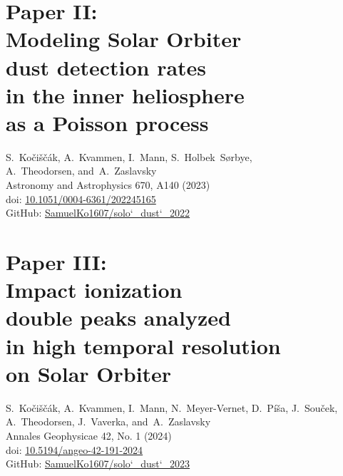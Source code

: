 \documentclass[11pt,twoside,openright]{book}
\begin{document}
\chapter[Paper II: Modeling Solar Orbiter dust detection rates in the inner heliosphere as a Poisson process]{Paper II:\\Modeling Solar Orbiter\\dust detection rates\\in the inner heliosphere\\as a Poisson process}
S.~Ko{\v{c}}i{\v{s}}{\v{c}}{\'a}k, A.~Kvammen, I.~Mann, S.~Holbek~S{\o}rbye,\\A.~Theodorsen, and~A.~Zaslavsky\\
Astronomy and Astrophysics 670, A140 (2023)\\
doi: \href{https://doi.org/10.1051/0004-6361/202245165}{10.1051/0004-6361/202245165}\\
GitHub: \href{https://zenodo.org/records/8325054}{SamuelKo1607/solo\char`_dust\char`_2022}\\
\newpage\null\newpage



\chapter[Paper III: Impact ionization double peaks analyzed in high temporal resolution on Solar Orbiter]{Paper III:\\Impact ionization\\double peaks analyzed\\in high temporal resolution\\on Solar Orbiter}
S.~Ko{\v{c}}i{\v{s}}{\v{c}}{\'a}k, A.~Kvammen, I.~Mann, N.~Meyer-Vernet, D.~P{\'i}{\v{s}}a, J.~Sou{\v{c}}ek, A.~Theodorsen, J.~Vaverka, and~A.~Zaslavsky\\
Annales Geophysicae 42, No. 1 (2024)\\
doi: \href{https://doi.org/10.5194/angeo-42-191-2024}{10.5194/angeo-42-191-2024}\\
GitHub: \href{https://zenodo.org/records/8325050}{SamuelKo1607/solo\char`_dust\char`_2023}\\
\newpage\null\newpage

\end{document}

